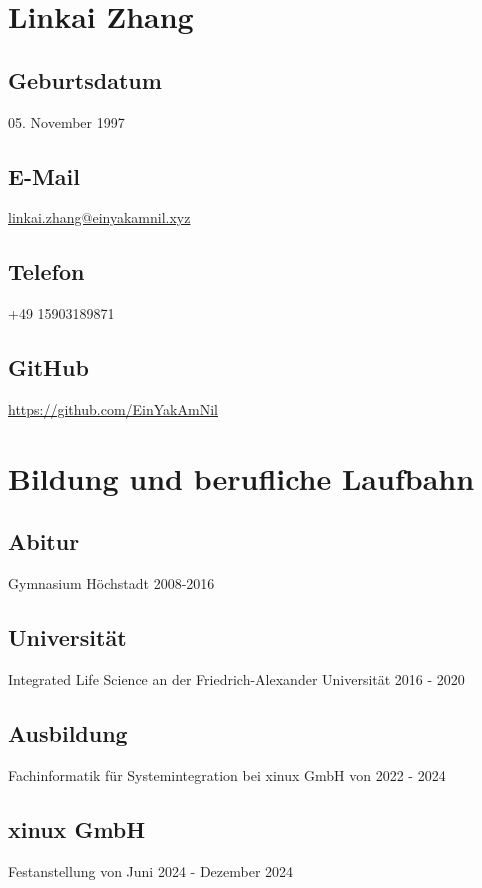 \documentclass{article}
\begin{document}
\author{Linkai Zhang}

\section{Linkai Zhang}

\subsection{Geburtsdatum}
05. November 1997

\subsection{E-Mail}
\href{mailto:linkai.zhang@einyamkamnil.xyz}{linkai.zhang@einyakamnil.xyz}

\subsection{Telefon}
+49 15903189871

\subsection{GitHub}
\href{https://github.com/EinYakAmNil}{https://github.com/EinYakAmNil}

\section{Bildung und berufliche Laufbahn}

\subsection{Abitur}
Gymnasium Höchstadt 2008-2016

\subsection{Universität}
Integrated Life Science an der Friedrich-Alexander Universität 2016 - 2020

\subsection{Ausbildung}
Fachinformatik für Systemintegration bei xinux GmbH von 2022 - 2024

\subsection{xinux GmbH}
Festanstellung von Juni 2024 - Dezember 2024
\end{document}

